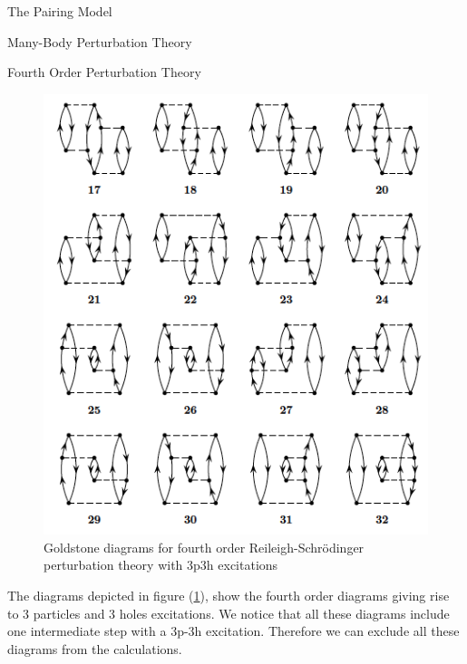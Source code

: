 \documentclass[twoside,english]{uiofysmaster}
\begin{document}
\begin{chapter}{The Pairing Model}
\begin{section}{Many-Body Perturbation Theory}
\begin{subsection}{Fourth Order Perturbation Theory}
			\begin{figure}[H]
				\includegraphics[width=\textwidth]{Figures/fourthorder3p3h.png}
				\caption{Goldstone diagrams for fourth order Reileigh-Schr\"{o}dinger perturbation theory with 3p3h excitations}
				\label{figure:mbpt3p3h}
			\end{figure}
			The diagrams depicted in figure (\ref{figure:mbpt3p3h}), show the fourth order diagrams giving rise to 3 particles and 3 holes excitations. We notice that all these diagrams include one intermediate step with a 3p-3h excitation. Therefore we can exclude all these diagrams from the calculations.  


\end{subsection}
\end{section}
\end{chapter}
\end{document}
